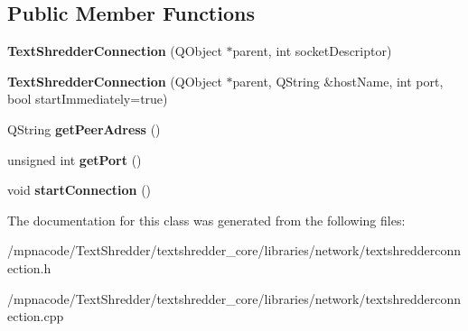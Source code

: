 \subsection*{Public Member Functions}
\begin{DoxyCompactItemize}
\item 
{\bfseries TextShredderConnection} (QObject $\ast$parent, int socketDescriptor)\label{class_text_shredder_connection_aca5f89fc0dcae6ca7a43e664d45ab160}

\item 
{\bfseries TextShredderConnection} (QObject $\ast$parent, QString \&hostName, int port, bool startImmediately=true)\label{class_text_shredder_connection_ad1502e7612fcc452570d5ebb633660b3}

\item 
QString {\bfseries getPeerAdress} ()\label{class_text_shredder_connection_a1cf29acb2ad543d48eaa8eea44d2a2da}

\item 
unsigned int {\bfseries getPort} ()\label{class_text_shredder_connection_a4925dd4b35f266217ce2c4efb4cd7204}

\item 
void {\bfseries startConnection} ()\label{class_text_shredder_connection_afa16f3b5d315485e4260054c7ff5ea01}

\end{DoxyCompactItemize}


The documentation for this class was generated from the following files:\begin{DoxyCompactItemize}
\item 
/mpnacode/TextShredder/textshredder\_\-core/libraries/network/textshredderconnection.h\item 
/mpnacode/TextShredder/textshredder\_\-core/libraries/network/textshredderconnection.cpp\end{DoxyCompactItemize}
